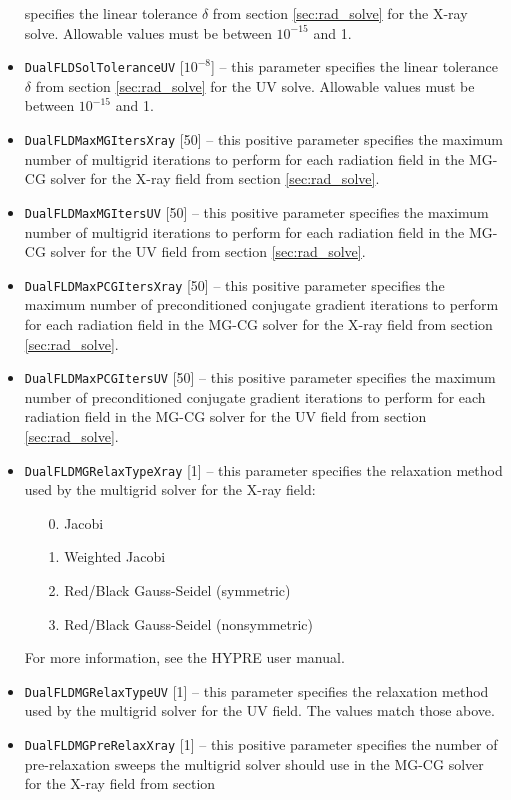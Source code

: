 \documentclass[letterpaper,10pt]{article}
\renewcommand{\(}{\left(}
\renewcommand{\)}{\right)}
\begin{document}
\begin{itemize}
  specifies the linear tolerance $\delta$ from section
  \ref{sec:rad_solve} for the X-ray solve.  Allowable values must be
  between $10^{-15}$ and 1. 
\item {\tt DualFLDSolToleranceUV} [$10^{-8}$] -- this parameter
  specifies the linear tolerance $\delta$ from section
  \ref{sec:rad_solve} for the UV solve.  Allowable values must be
  between $10^{-15}$ and 1. 
\item {\tt DualFLDMaxMGItersXray} [50] -- this positive parameter
  specifies the maximum number of multigrid iterations to perform for
  each radiation field in the MG-CG solver for the X-ray field from section
  \ref{sec:rad_solve}.
\item {\tt DualFLDMaxMGItersUV} [50] -- this positive parameter
  specifies the maximum number of multigrid iterations to perform for
  each radiation field in the MG-CG solver for the UV field from section
  \ref{sec:rad_solve}.
\item {\tt DualFLDMaxPCGItersXray} [50] -- this positive parameter
  specifies the maximum number of preconditioned conjugate gradient
  iterations to perform for each radiation field in the MG-CG solver
  for the X-ray field from section \ref{sec:rad_solve}.
\item {\tt DualFLDMaxPCGItersUV} [50] -- this positive parameter
  specifies the maximum number of preconditioned conjugate gradient
  iterations to perform for each radiation field in the MG-CG solver
  for the UV field from section \ref{sec:rad_solve}.
\item {\tt DualFLDMGRelaxTypeXray} [1] -- this parameter specifies the
  relaxation method used by the multigrid solver for the X-ray field:
  \begin{itemize}
  \item[0.] Jacobi
  \item[1.] Weighted Jacobi
  \item[2.] Red/Black Gauss-Seidel (symmetric)
  \item[3.] Red/Black Gauss-Seidel (nonsymmetric)
  \end{itemize}
  For more information, see the HYPRE user manual.
\item {\tt DualFLDMGRelaxTypeUV} [1] -- this parameter specifies the
  relaxation method used by the multigrid solver for the UV field.
  The values match those above.
\item {\tt DualFLDMGPreRelaxXray} [1] -- this positive parameter
  specifies the number of pre-relaxation sweeps the multigrid solver
  should use in the MG-CG solver for the X-ray field from section

\end{itemize}
\end{document}
